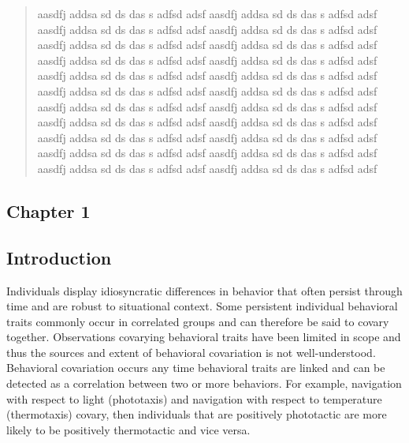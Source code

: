 \documentclass[12pt,letterpaper]{article}
\begin{document}
\setcounter{page}{3}
\begin{abstract}
    aasdfj addsa sd ds das s adfsd adsf aasdfj addsa sd ds das s adfsd adsf aasdfj addsa sd ds das s adfsd adsf aasdfj addsa sd ds das s adfsd adsf aasdfj addsa sd ds das s adfsd adsf aasdfj addsa sd ds das s adfsd adsf aasdfj addsa sd ds das s adfsd adsf aasdfj addsa sd ds das s adfsd adsf aasdfj addsa sd ds das s adfsd adsf aasdfj addsa sd ds das s adfsd adsf aasdfj addsa sd ds das s adfsd adsf aasdfj addsa sd ds das s adfsd adsf aasdfj addsa sd ds das s adfsd adsf aasdfj addsa sd ds das s adfsd adsf aasdfj addsa sd ds das s adfsd adsf aasdfj addsa sd ds das s adfsd adsf aasdfj addsa sd ds das s adfsd adsf aasdfj addsa sd ds das s adfsd adsf aasdfj addsa sd ds das s adfsd adsf aasdfj addsa sd ds das s adfsd adsf aasdfj addsa sd ds das s adfsd adsf aasdfj addsa sd ds das s adfsd adsf  
\end{abstract}

\clearpage
\begin{center}
    \Large\section{Chapter 1}
    \setcounter{page}{1}        %
    \thispagestyle{empty}       %
    \clearpage
\end{center}

\subsection{Introduction}

Individuals display idiosyncratic differences in behavior that often persist through time and are robust to situational context. Some persistent individual behavioral traits commonly occur in correlated groups and can therefore be said to covary together. Observations covarying behavioral traits have been limited in scope and thus the sources and extent of behavioral covariation is not well-understood. Behavioral covariation occurs any time behavioral traits are linked and can be detected as a correlation between two or more behaviors. For example, navigation with respect to light (phototaxis) and navigation with respect to temperature (thermotaxis) covary, then individuals that are positively phototactic are more likely to be positively thermotactic and vice versa. 
\end{document}
